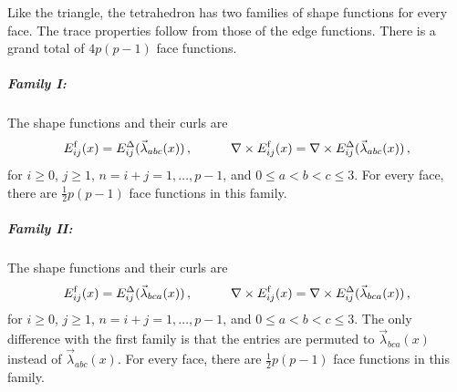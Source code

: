 %

Like the triangle, the tetrahedron has two families of shape functions for every face.
The trace properties follow from those of the edge functions.
There is a grand total of $4p(p-1)$ face functions.

\subparagraph{Family I:} 
The shape functions and their curls are
\begin{equation}
	E_{ij}^{\mathrm{f}}(x)=E_{ij}^\Delta(\vec{\lambda}_{abc}(x))\,,\qquad\quad
		\nabla\times E_{ij}^{\mathrm{f}}(x)=\nabla\times E_{ij}^\Delta(\vec{\lambda}_{abc}(x))\,,
\end{equation}
for $i\geq0$, $j\geq1$, $n=i+j=1,\ldots,p-1$, and $0\leq a<b<c\leq3$. 
For every face, there are $\frac{1}{2}p(p-1)$ face functions in this family.

\subparagraph{Family II:}
The shape functions and their curls are
\begin{equation}
	E_{ij}^{\mathrm{f}}(x)=E_{ij}^\Delta(\vec{\lambda}_{bca}(x))\,,\qquad\quad
		\nabla\times E_{ij}^{\mathrm{f}}(x)=\nabla\times E_{ij}^\Delta(\vec{\lambda}_{bca}(x))\,,
\end{equation}
for $i\geq0$, $j\geq1$, $n=i+j=1,\ldots,p-1$, and $0\leq a<b<c\leq3$.
The only difference with the first family is that the entries are permuted to $\vec{\lambda}_{bca}(x)$ instead of $\vec{\lambda}_{abc}(x)$.
For every face, there are $\frac{1}{2}p(p-1)$ face functions in this family.

%


